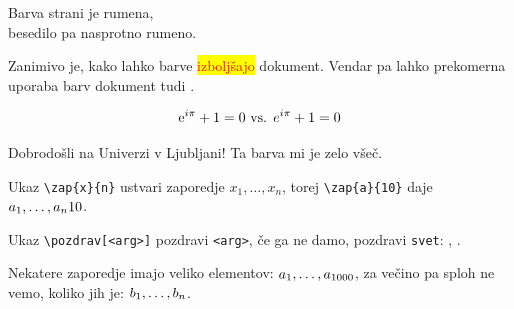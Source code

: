 \documentclass{article}
\begin{document}
\color{black} %

\newpage
\noindent
Barva strani je rumena, \\
besedilo pa nasprotno rumeno.


\vspace{2cm}

\begin{minipage}{0.4\textwidth}
Zanimivo je, kako lahko barve \colorbox{yellow}{\textcolor{red}{izboljšajo}} dokument. Vendar pa lahko prekomerna uporaba barv dokument tudi .
\end{minipage}



\[
\mathrm{e}^{i \mathrm{\pi}} + 1 = 0 \text{ vs. }
e^{i \pi} + 1 = 0
\]

\vspace{2cm}
\begin{minipage}{0.4\textwidth}
Dobrodošli na
  \textcolor[RGB]{226,25,30}{Univerzi v Ljubljani}!
  Ta \textcolor[RGB]{226,25,30}{barva} mi je zelo všeč.
\end{minipage}


\vspace{2cm}
\begin{minipage}{0.4\textwidth}
Ukaz \texttt{\textbackslash zap\{x\}\{n\}} ustvari zaporedje $x_{1}, \dots, x_{n}$,
torej \texttt{\textbackslash zap\{a\}\{10\}} daje $ \zap{a}{10} $.
\end{minipage}



\vspace{2cm}
\begin{minipage}{0.4\textwidth}
  Ukaz 
\texttt{\textbackslash pozdrav[<arg>]}
pozdravi \texttt{<arg>}, če ga ne damo, pozdravi \texttt{svet}:
\pozdrav[vsi], \pozdrav.
\end{minipage}

\vspace{2cm}
\begin{minipage}{0.4\textwidth}
Nekatere zaporedje imajo veliko elementov:
$\zap[1000]{a}$, 
za večino pa sploh ne vemo, 
koliko jih je:
$\zap{b}$.
\end{minipage}


\vspace{2cm}
\end{document}
